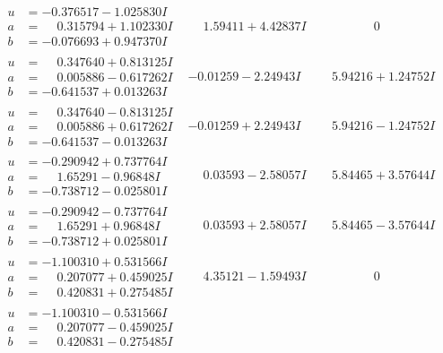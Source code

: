\documentclass[1p]{elsarticle_modified}
\theoremstyle{definition}
\begin{document}
$$\begin{array}{c|c|c}
\begin{aligned}
u &= -0.376517 - 1.025830 I \\
a &= \phantom{-}0.315794 + 1.102330 I \\
b &= -0.076693 + 0.947370 I\end{aligned}
 & \phantom{-}1.59411 + 4.42837 I & \phantom{-0.000000 } 0 \\ \hline\begin{aligned}
u &= \phantom{-}0.347640 + 0.813125 I \\
a &= \phantom{-}0.005886 - 0.617262 I \\
b &= -0.641537 + 0.013263 I\end{aligned}
 & -0.01259 - 2.24943 I & \phantom{-}5.94216 + 1.24752 I \\ \hline\begin{aligned}
u &= \phantom{-}0.347640 - 0.813125 I \\
a &= \phantom{-}0.005886 + 0.617262 I \\
b &= -0.641537 - 0.013263 I\end{aligned}
 & -0.01259 + 2.24943 I & \phantom{-}5.94216 - 1.24752 I \\ \hline\begin{aligned}
u &= -0.290942 + 0.737764 I \\
a &= \phantom{-}1.65291 - 0.96848 I \\
b &= -0.738712 - 0.025801 I\end{aligned}
 & \phantom{-}0.03593 - 2.58057 I & \phantom{-}5.84465 + 3.57644 I \\ \hline\begin{aligned}
u &= -0.290942 - 0.737764 I \\
a &= \phantom{-}1.65291 + 0.96848 I \\
b &= -0.738712 + 0.025801 I\end{aligned}
 & \phantom{-}0.03593 + 2.58057 I & \phantom{-}5.84465 - 3.57644 I \\ \hline\begin{aligned}
u &= -1.100310 + 0.531566 I \\
a &= \phantom{-}0.207077 + 0.459025 I \\
b &= \phantom{-}0.420831 + 0.275485 I\end{aligned}
 & \phantom{-}4.35121 - 1.59493 I & \phantom{-0.000000 } 0 \\ \hline\begin{aligned}
u &= -1.100310 - 0.531566 I \\
a &= \phantom{-}0.207077 - 0.459025 I \\
b &= \phantom{-}0.420831 - 0.275485 I\end{aligned}

\end{array}$$
\end{document}
